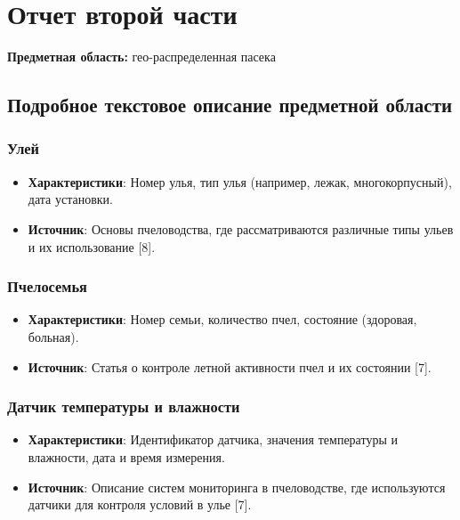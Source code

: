 \documentclass{article}
\begin{document}
\itmo[
      variant=Пасека,
      labn=2,
      discipline=Информационные системы,
      group=P3312,
      student=Соколов Анатолий Владимирович \\ Пархоменко Кирилл Александрович,
      teacher=Бострикова Дарья Константиновна
]
\lstset{language=java}
\tableofcontents

\section{Отчет второй части}

\textbf{Предметная область:} гео-распределенная пасека

\subsection{Подробное текстовое описание предметной области}

\subsubsection{Улей}
\begin{itemize}
    \item \textbf{Характеристики}: Номер улья, тип улья (например, лежак, многокорпусный), дата установки.
    \item \textbf{Источник}: Основы пчеловодства, где рассматриваются различные типы ульев и их использование [8].
\end{itemize}

\subsubsection{Пчелосемья}
\begin{itemize}
    \item \textbf{Характеристики}: Номер семьи, количество пчел, состояние (здоровая, больная).
    \item \textbf{Источник}: Статья о контроле летной активности пчел и их состоянии [7].
\end{itemize}

\subsubsection{Датчик температуры и влажности}
\begin{itemize}
    \item \textbf{Характеристики}: Идентификатор датчика, значения температуры и влажности, дата и время измерения.
    \item \textbf{Источник}: Описание систем мониторинга в пчеловодстве, где используются датчики для контроля условий в улье [7].
\end{itemize}
\end{document}
